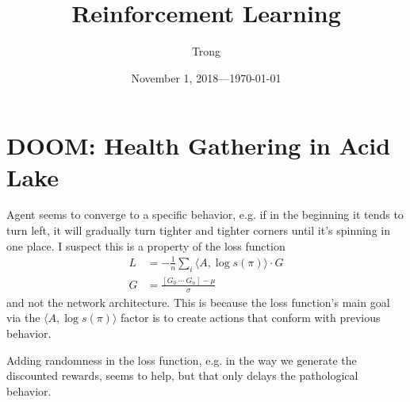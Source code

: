 \documentclass[20pt]{extarticle}
\title{Reinforcement Learning}
\author{Trong}
\date{November 1, 2018---\today}
\theoremstyle{plain}
\theoremstyle{definition}
\theoremstyle{remark}
\newcommand{\0}{\varnothing}
\newcommand{\m}{\mu}
\newcommand{\s}{\sigma}
\newcommand{\<}{\langle}
\renewcommand{\>}{\rangle}
\begin{document}
\sloppy
\maketitle
\thispagestyle{empty}
\pagestyle{empty}
\tableofcontents

\section{DOOM: Health Gathering in Acid Lake}

Agent seems to converge to a specific behavior, e.g. if in the beginning it tends to turn left, it will gradually turn tighter and tighter corners until it's spinning in one place. I suspect this is a property of the loss function
\begin{align*}
  L &= - \frac{1}{n} \sum_{i} \< A, \log s(\pi) \> \cdot G \\
  G &= \frac{[G_0 \ \cdots \ G_n] - \m}{\s}
\end{align*}
and not the network architecture. This is because the loss function's main goal via the \( \< A, \log s(\pi) \> \) factor is to create actions that conform with previous behavior.

Adding randomness in the loss function, e.g. in the way we generate the discounted rewards, seems to help, but that only delays the pathological behavior.
\end{document}
